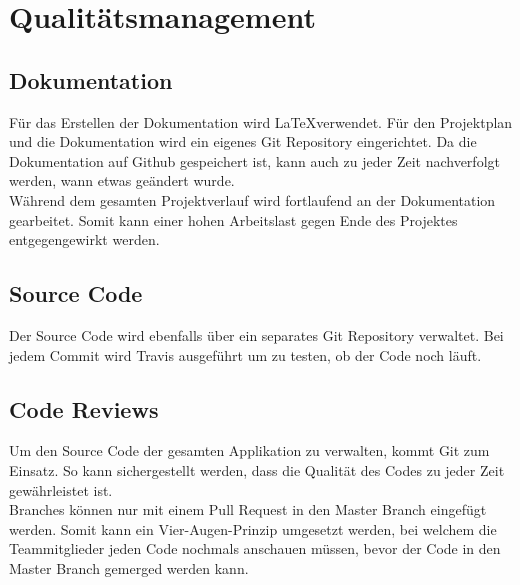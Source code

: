 \section{Qualitätsmanagement}
\subsection{Dokumentation}
Für das Erstellen der Dokumentation wird \LaTeX verwendet. Für den Projektplan und die Dokumentation wird ein eigenes Git Repository eingerichtet. Da die Dokumentation auf Github gespeichert ist, kann auch zu jeder Zeit nachverfolgt werden, wann etwas geändert wurde. \\
Während dem gesamten Projektverlauf wird fortlaufend an der Dokumentation gearbeitet. Somit kann einer hohen Arbeitslast gegen Ende des Projektes entgegengewirkt werden.

\subsection{Source Code}
Der Source Code wird ebenfalls über ein separates Git Repository verwaltet. Bei jedem Commit wird Travis ausgeführt um zu testen, ob der Code noch läuft.

\subsection{Code Reviews}
Um den Source Code der gesamten Applikation zu verwalten, kommt Git zum Einsatz. So kann sichergestellt werden, dass die Qualität des Codes zu jeder Zeit gewährleistet ist.\\
Branches können nur mit einem Pull Request in den Master Branch eingefügt werden. Somit kann ein Vier-Augen-Prinzip umgesetzt werden, bei welchem die Teammitglieder jeden Code nochmals anschauen müssen, bevor der Code in den Master Branch gemerged werden kann.

\newpage